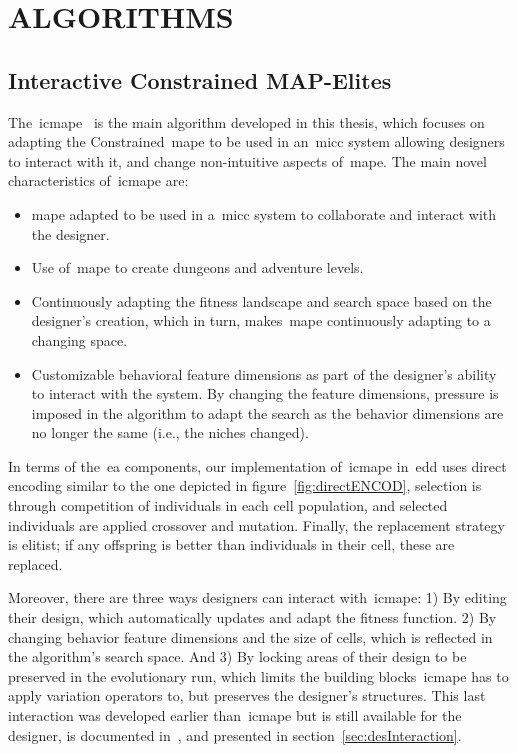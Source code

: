 \section{ALGORITHMS}  \normalfont

\subsection{Interactive Constrained MAP-Elites}
\label{sec:icmap-elites}

The~\acrfull{icmape}~\cite{alvarez2019empowering,Alvarez2020-ICMAPE} is the main algorithm developed in this thesis, which focuses on adapting the Constrained~\acrshort{mape} to be used in an~\acrshort{micc} system allowing designers to interact with it, and change non-intuitive aspects of~\acrshort{mape}. The main novel characteristics of~\acrshort{icmape} are:

\begin{itemize}
    \item \acrshort{mape} adapted to be used in a~\acrshort{micc} system to collaborate and interact with the designer.
    \item Use of~\acrshort{mape} to create dungeons and adventure levels.
    \item Continuously adapting the fitness landscape and search space based on the designer's creation, which in turn, makes~\acrshort{mape} continuously adapting to a changing space.
    \item Customizable behavioral feature dimensions as part of the designer's ability to interact with the system. By changing the feature dimensions, pressure is imposed in the algorithm to adapt the search as the behavior dimensions are no longer the same (i.e., the niches changed).
\end{itemize}

In terms of the~\acrshort{ea} components, our implementation of~\acrshort{icmape} in~\acrshort{edd} uses direct encoding similar to the one depicted in figure~\ref{fig:directENCOD}, selection is through competition of individuals in each cell population, and selected individuals are applied crossover and mutation. Finally, the replacement strategy is elitist; if any offspring is better than individuals in their cell, these are replaced. 

Moreover, there are three ways designers can interact with~\acrshort{icmape}: 1) By editing their design, which automatically updates and adapt the fitness function. 2) By changing behavior feature dimensions and the size of cells, which is reflected in the algorithm's search space. And 3) By locking areas of their design to be preserved in the evolutionary run, which limits the building blocks~\acrshort{icmape} has to apply variation operators to, but preserves the designer's structures. This last interaction was developed earlier than~\acrshort{icmape} but is still available for the designer, is documented in~\cite{Alvarez2018a}, and presented in section~\ref{sec:desInteraction}.

